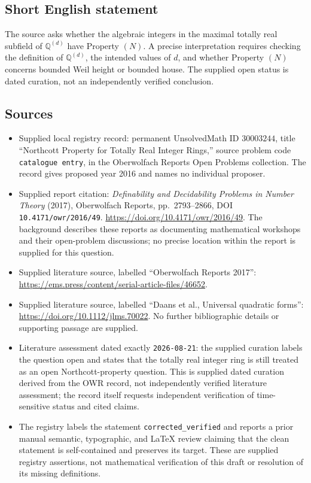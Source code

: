 \documentclass[11pt]{article}
\begin{document}
\subsection{Short English statement}
The source asks whether the algebraic integers in the maximal totally real subfield of \(\mathbb Q^{(d)}\) have Property \((N)\). A precise interpretation requires checking the definition of \(\mathbb Q^{(d)}\), the intended values of \(d\), and whether Property \((N)\) concerns bounded Weil height or bounded house. The supplied open status is dated curation, not an independently verified conclusion.
\subsection{Sources}
\begin{itemize}
\item Supplied local registry record: permanent UnsolvedMath ID \(30003244\), title ``Northcott Property for Totally Real Integer Rings,'' source problem code \texttt{catalogue entry}, in the Oberwolfach Reports Open Problems collection. The record gives proposed year 2016 and names no individual proposer.
\item Supplied report citation: \emph{Definability and Decidability Problems in Number Theory} (2017), Oberwolfach Reports, pp.\ 2793--2866, DOI \texttt{10.4171/owr/2016/49}. \url{https://doi.org/10.4171/owr/2016/49}. The background describes these reports as documenting mathematical workshops and their open-problem discussions; no precise location within the report is supplied for this question.
\item Supplied literature source, labelled ``Oberwolfach Reports 2017'': \url{https://ems.press/content/serial-article-files/46652}.
\item Supplied literature source, labelled ``Daans et al., Universal quadratic forms'': \url{https://doi.org/10.1112/jlms.70022}. No further bibliographic details or supporting passage are supplied.
\item Literature assessment dated exactly \texttt{2026-08-21}: the supplied curation labels the question open and states that the totally real integer ring is still treated as an open Northcott-property question. This is supplied dated curation derived from the OWR record, not independently verified literature assessment; the record itself requests independent verification of time-sensitive status and cited claims.
\item The registry labels the statement \texttt{corrected\_verified} and reports a prior manual semantic, typographic, and LaTeX review claiming that the clean statement is self-contained and preserves its target. These are supplied registry assertions, not mathematical verification of this draft or resolution of its missing definitions.
\end{itemize}
\end{document}
